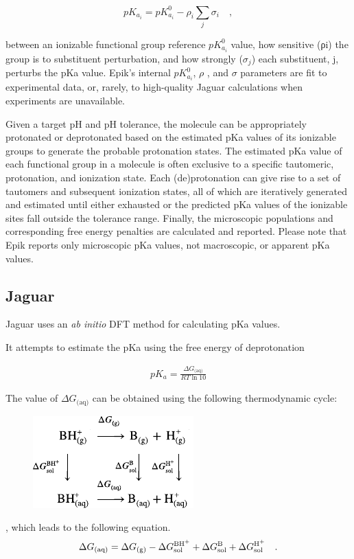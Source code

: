 \documentclass[9pt,lineno,final]{elife}
\begin{document}
\begin{equation}
 pK_{a_i} = pK_{a_i}^0 - \rho_i  \sum_j \sigma_i \quad ,
\end{equation}

between an ionizable functional group reference $pK_{a_i}^0$ value, how sensitive (ρi) the group is to substituent perturbation, and how strongly ($\sigma_j$) each substituent, j, perturbs the pKa value. Epik’s internal $pK_{a_i}^0$, $\rho$ , and $\sigma$  parameters are fit to experimental data, or, rarely, to high-quality Jaguar calculations when experiments are unavailable.

Given a target pH and pH tolerance, the molecule can be appropriately protonated or deprotonated based on the estimated pKa values of its ionizable groups to generate the probable protonation states. The estimated pKa value of each functional group in a molecule is often exclusive to a specific tautomeric, protonation, and ionization state. Each (de)protonation can give rise to a set of tautomers and subsequent ionization states, all of which are iteratively generated and estimated until either exhausted or the predicted pKa values of the ionizable sites fall outside the tolerance range. Finally, the microscopic populations and corresponding free energy penalties are calculated and reported. Please note that Epik reports only microscopic pKa values, not macroscopic, or apparent pKa values.

\subsection{Jaguar}

Jaguar uses an \textit{ab initio} DFT method for calculating pKa values. 

It attempts to estimate the pKa using the free energy of deprotonation  

\begin{align}
 pK_a = \frac{\Delta G_\textrm{(aq)}}{RT \ln 10}  
\end{align}

The value of $ \Delta G_\textrm{(aq)}$ can be obtained using the following thermodynamic cycle:
%
\begin{figure}[H]
\centering
 \includegraphics{jaguar-reaction}
\end{figure}
%
, which leads to the following equation.
%
\begin{equation}
 \Delta G_\textrm{(aq)} = \Delta G_\textrm{(g)} - \Delta G^\textrm{\ce{BH+}}_\textrm{sol} + \Delta G^\textrm{\ce{B}}_\textrm{sol}  +  \Delta G^\textrm{\ce{H+}}_\textrm{sol} \quad .
\end{equation}
\end{document}
